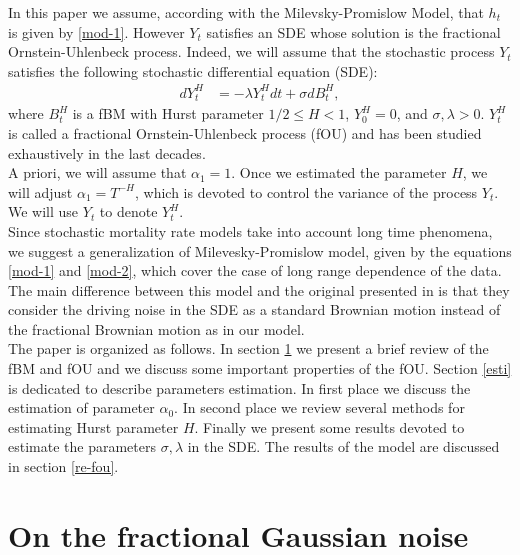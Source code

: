\documentclass[smallextended]{svjour3}
\begin{document}
In this paper we assume, according with the Milevsky-Promislow Model, that 
$h_t$ is given by
\eqref{mod-1}. However $Y_t$ satisfies an SDE whose solution is the fractional 
Ornstein-Uhlenbeck process. Indeed,
we will assume that the stochastic process $Y_t$ satisfies the following 
stochastic differential
equation (SDE):
\begin{align}
dY_t^H&=-\lambda Y_t^Hdt+\sigma dB_t^H,  \label{mod-2}
\end{align}
where $B_t^H $ is a fBM with Hurst parameter $1/2 \le H< 1$, $Y_0^H=0$, and 
$\sigma,\lambda> 0$.
$Y_t^H$ is called a fractional Ornstein-Uhlenbeck process (fOU) and has been 
studied exhaustively
in the last decades. \\


A priori, we will assume that $\alpha_1=1$. Once we estimated the parameter 
$H$, we will
adjust $\alpha_1=T^{-H}$, which is devoted to control the variance of the 
process $Y_t$.
We will use $Y_t$ to denote $Y_t^H$.\\

Since stochastic mortality rate models take into account long time phenomena, we
suggest a generalization of Milevesky-Promislow model, given by the equations
\eqref{mod-1} and \eqref{mod-2}, which cover the case of long range dependence 
of
the data.\\

The main difference between this model and the original presented
in \cite{mi-pr} is that they consider the driving noise in the SDE as a standard
Brownian motion instead of the fractional Brownian motion as in our model.\\



The paper is organized as follows. In section \ref{fgn} we present a brief 
review of
the fBM and fOU and we discuss some important properties of the fOU. Section 
\ref{esti}
is dedicated to describe parameters estimation.
In first place we discuss the estimation of parameter $\alpha_0$. In second 
place we review several
methods for estimating  Hurst parameter
$H$. Finally we present some results devoted to estimate the parameters
$\sigma,\lambda$ in the SDE. The results of the
model are discussed in section \ref{re-fou}.\\


\section{On the fractional Gaussian noise}
\label{fgn}
\end{document}
